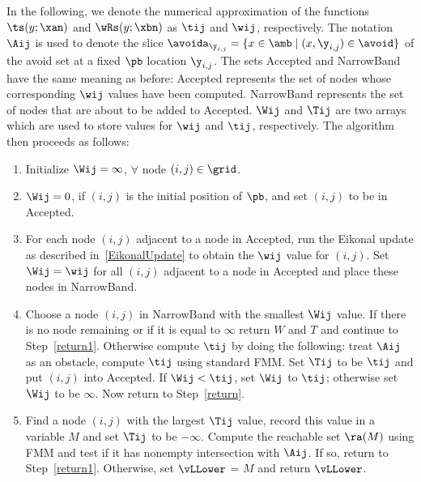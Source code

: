 In the following, we denote the numerical approximation of the functions $\ts(y;\xan)$ and $\wRs(y;\xbn)$ as $\tij$ and $\wij$, respectively.  The notation $\Aij$ is used to denote the slice $\avoida_{\y_{i,j}} = \{x \in \amb \mid (x,\y_{i,j}) \in \avoid \}$ of the avoid set at a fixed $\pb$ location $\y_{i,j}$.  The sets Accepted and NarrowBand have the same meaning as before: Accepted represents the set of nodes whose corresponding $\wij$ values have been computed.
NarrowBand represents the set of nodes that are about to be added to Accepted.
$\Wij$ and $\Tij$ are two arrays which are used to store values for $\wij$ and $\tij$, respectively. 
The algorithm then proceeds as follows:
\begin{enumerate}
\item
Initialize $\Wij = \infty$, $\forall$ node $(i,j)\in\grid$.

\item
$\Wij = 0$, if $(i,j)$ is the initial position of $\pb$, and set $(i,j)$ to be in Accepted.

\item\label{return}
For each node $(i,j)$ adjacent to a node in Accepted, run the Eikonal update as described in~\eqref{EikonalUpdate} to obtain the $
\wij$ value for $(i,j)$.  Set $\Wij = \wij$ for all $(i,j)$ adjacent to a node in Accepted and place these nodes in NarrowBand. 

\item\label{note}
Choose a node $(i,j)$ in NarrowBand with the smallest $\Wij$ value. If there is no node remaining or if it is equal to $\infty$ return $W$ and $T$ and continue to Step~\ref{return1}.  Otherwise compute $\tij$ by doing the following:
treat $\Aij$ as an obstacle, compute $\tij$ using standard FMM. 
Set $\Tij$ to be $\tij$ and put $(i,j)$ into Accepted. If $\Wij < \tij$, set $\Wij$ to $\tij$; otherwise set $\Wij$ to be $\infty$. Now return to Step~\ref{return}. 

\item\label{return1}
Find a node $(i,j)$ with the largest $\Tij$ value, record this value in a variable $M$ and set $\Tij$ to be $-$$\infty$.
Compute the reachable set $\ra(M)$ using FMM and test if it has nonempty intersection with $\Aij$. If so, return to Step~\ref{return1}. Otherwise, set $\vLLower$ = $M$ and return $\vLLower$.
\end{enumerate}

%

